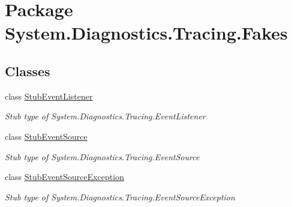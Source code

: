 \hypertarget{namespace_system_1_1_diagnostics_1_1_tracing_1_1_fakes}{\section{Package System.\-Diagnostics.\-Tracing.\-Fakes}
\label{namespace_system_1_1_diagnostics_1_1_tracing_1_1_fakes}
}
\subsection*{Classes}
\begin{DoxyCompactItemize}
\item 
class \hyperlink{class_system_1_1_diagnostics_1_1_tracing_1_1_fakes_1_1_stub_event_listener}{Stub\-Event\-Listener}
\begin{DoxyCompactList}\small\item\em Stub type of System.\-Diagnostics.\-Tracing.\-Event\-Listener\end{DoxyCompactList}\item 
class \hyperlink{class_system_1_1_diagnostics_1_1_tracing_1_1_fakes_1_1_stub_event_source}{Stub\-Event\-Source}
\begin{DoxyCompactList}\small\item\em Stub type of System.\-Diagnostics.\-Tracing.\-Event\-Source\end{DoxyCompactList}\item 
class \hyperlink{class_system_1_1_diagnostics_1_1_tracing_1_1_fakes_1_1_stub_event_source_exception}{Stub\-Event\-Source\-Exception}
\begin{DoxyCompactList}\small\item\em Stub type of System.\-Diagnostics.\-Tracing.\-Event\-Source\-Exception\end{DoxyCompactList}\end{DoxyCompactItemize}
